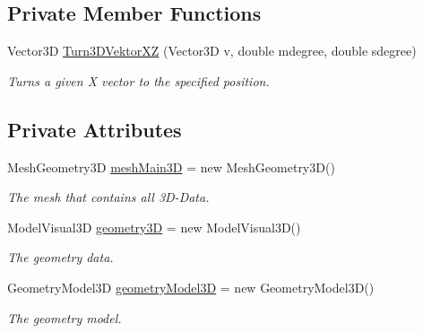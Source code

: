 \subsection*{Private Member Functions}
\begin{DoxyCompactItemize}
\item 
Vector3D \hyperlink{class_l_i_d_a_r___controller_1_1_measurement_aff21228516e88970db70287d41ff2e42}{Turn3\+D\+Vektor\+XZ} (Vector3D v, double mdegree, double sdegree)
\begin{DoxyCompactList}\small\item\em Turns a given X vector to the specified position. \end{DoxyCompactList}\end{DoxyCompactItemize}
\subsection*{Private Attributes}
\begin{DoxyCompactItemize}
\item 
Mesh\+Geometry3D \hyperlink{class_l_i_d_a_r___controller_1_1_measurement_af5ee635f5060386fb2eb131af46b962e}{mesh\+Main3D} = new Mesh\+Geometry3D()\hypertarget{class_l_i_d_a_r___controller_1_1_measurement_af5ee635f5060386fb2eb131af46b962e}{}\label{class_l_i_d_a_r___controller_1_1_measurement_af5ee635f5060386fb2eb131af46b962e}

\begin{DoxyCompactList}\small\item\em The mesh that contains all 3\+D-\/\+Data. \end{DoxyCompactList}\item 
Model\+Visual3D \hyperlink{class_l_i_d_a_r___controller_1_1_measurement_a4cfcc2d0aa8295420f3f622921f21c85}{geometry3D} = new Model\+Visual3D()\hypertarget{class_l_i_d_a_r___controller_1_1_measurement_a4cfcc2d0aa8295420f3f622921f21c85}{}\label{class_l_i_d_a_r___controller_1_1_measurement_a4cfcc2d0aa8295420f3f622921f21c85}

\begin{DoxyCompactList}\small\item\em The geometry data. \end{DoxyCompactList}\item 
Geometry\+Model3D \hyperlink{class_l_i_d_a_r___controller_1_1_measurement_a7b9f5c03ce8253b95e1d94afef96c533}{geometry\+Model3D} = new Geometry\+Model3D()\hypertarget{class_l_i_d_a_r___controller_1_1_measurement_a7b9f5c03ce8253b95e1d94afef96c533}{}\label{class_l_i_d_a_r___controller_1_1_measurement_a7b9f5c03ce8253b95e1d94afef96c533}

\begin{DoxyCompactList}\small\item\em The geometry model. \end{DoxyCompactList}\end{DoxyCompactItemize}


